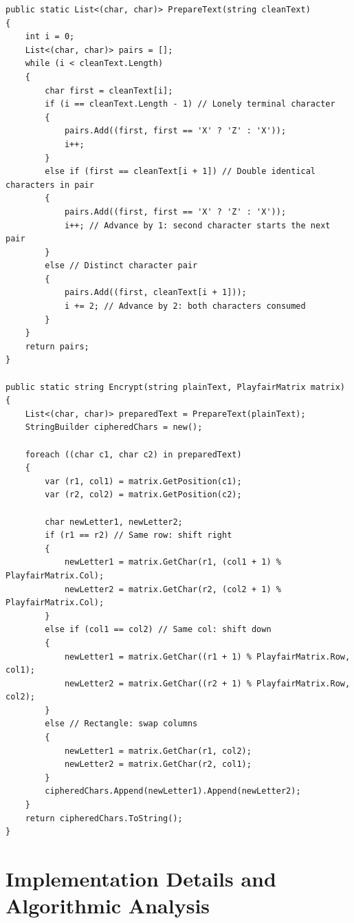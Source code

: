 \documentclass[12pt,a4paper]{article}
\begin{document}
\begin{lstlisting}[caption={Text Preparation and Encryption in PlayfairCipher.cs}, label={lst:cipher}]
public static List<(char, char)> PrepareText(string cleanText)
{
    int i = 0;
    List<(char, char)> pairs = [];
    while (i < cleanText.Length)
    {
        char first = cleanText[i];
        if (i == cleanText.Length - 1) // Lonely terminal character
        {
            pairs.Add((first, first == 'X' ? 'Z' : 'X'));
            i++;
        }
        else if (first == cleanText[i + 1]) // Double identical characters in pair
        {
            pairs.Add((first, first == 'X' ? 'Z' : 'X'));
            i++; // Advance by 1: second character starts the next pair
        }
        else // Distinct character pair
        {
            pairs.Add((first, cleanText[i + 1]));
            i += 2; // Advance by 2: both characters consumed
        }
    }
    return pairs;
}

public static string Encrypt(string plainText, PlayfairMatrix matrix)
{
    List<(char, char)> preparedText = PrepareText(plainText);
    StringBuilder cipheredChars = new();

    foreach ((char c1, char c2) in preparedText)
    {
        var (r1, col1) = matrix.GetPosition(c1);
        var (r2, col2) = matrix.GetPosition(c2);

        char newLetter1, newLetter2;
        if (r1 == r2) // Same row: shift right
        {
            newLetter1 = matrix.GetChar(r1, (col1 + 1) % PlayfairMatrix.Col);
            newLetter2 = matrix.GetChar(r2, (col2 + 1) % PlayfairMatrix.Col);
        }
        else if (col1 == col2) // Same col: shift down
        {
            newLetter1 = matrix.GetChar((r1 + 1) % PlayfairMatrix.Row, col1);
            newLetter2 = matrix.GetChar((r2 + 1) % PlayfairMatrix.Row, col2);
        }
        else // Rectangle: swap columns
        {
            newLetter1 = matrix.GetChar(r1, col2);
            newLetter2 = matrix.GetChar(r2, col1);
        }
        cipheredChars.Append(newLetter1).Append(newLetter2);
    }
    return cipheredChars.ToString();
}
\end{lstlisting}

\section{Implementation Details and Algorithmic Analysis}
\end{document}
